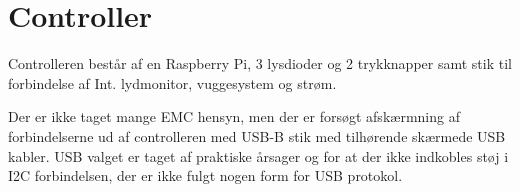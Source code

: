 \chapter{Controller}

Controlleren består af en Raspberry Pi, 3 lysdioder og 2 trykknapper samt stik til forbindelse af Int. lydmonitor, vuggesystem og strøm.

Der er ikke taget mange EMC hensyn, men der er forsøgt afskærmning af forbindelserne ud af controlleren med USB-B stik med tilhørende skærmede USB kabler. USB valget er taget af praktiske årsager og for at der ikke indkobles støj i I2C forbindelsen, der er ikke fulgt nogen form for USB protokol.

